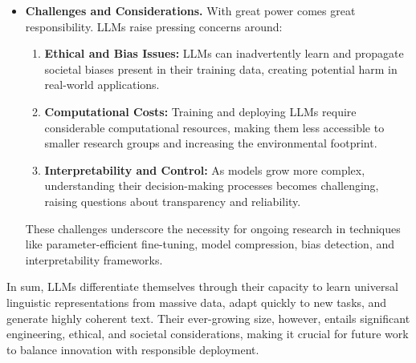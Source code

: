 \begin{itemize}
    \item \textbf{Challenges and Considerations.}
    With great power comes great responsibility. LLMs raise pressing concerns around:
    \begin{enumerate}
        \item \textbf{Ethical and Bias Issues:} LLMs can inadvertently learn and propagate societal biases present in their training data, creating potential harm in real-world applications.
        \item \textbf{Computational Costs:} Training and deploying LLMs require considerable computational resources, making them less accessible to smaller research groups and increasing the environmental footprint.
        \item \textbf{Interpretability and Control:} As models grow more complex, understanding their decision-making processes becomes challenging, raising questions about transparency and reliability.
    \end{enumerate}
    These challenges underscore the necessity for ongoing research in techniques like parameter-efficient fine-tuning, model compression, bias detection, and interpretability frameworks.

\end{itemize}

\noindent
In sum, LLMs differentiate themselves through their capacity to learn universal linguistic representations from massive data, adapt quickly to new tasks, and generate highly coherent text. Their ever-growing size, however, entails significant engineering, ethical, and societal considerations, making it crucial for future work to balance innovation with responsible deployment. 
